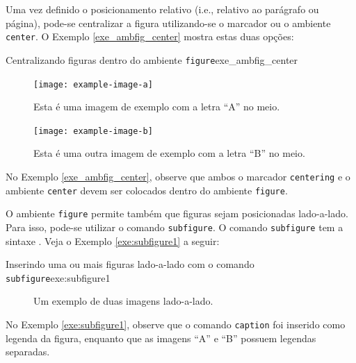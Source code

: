 Uma vez definido o posicionamento relativo (i.e., relativo ao parágrafo ou página), pode-se centralizar a figura utilizando-se o marcador \texttt{\centering} ou o ambiente {\tt center}. O Exemplo \ref{exe_ambfig_center} mostra estas duas opções:

\begin{texexptitled}[breakable,enhanced,middle=2mm]{Centralizando figuras dentro do ambiente {\tt figure}}{exe_ambfig_center}
\lipsum[1]
\begin{figure}[H]
\centering
\texttt{[image: example-image-a]}
\caption{Esta é uma imagem de exemplo com a letra ``A'' no meio.}
\end{figure}
\lipsum[2]
\begin{figure}[H]
    \begin{center}
        \texttt{[image: example-image-b]}
        \caption{Esta é uma outra imagem de exemplo com a letra ``B'' no meio.}
    \end{center}
\end{figure}
\end{texexptitled}

No Exemplo \ref{exe_ambfig_center}, observe que ambos o marcador \texttt{centering} e o ambiente {\tt center} devem ser colocados dentro do ambiente {\tt figure}.

O ambiente {\tt figure} permite também que figuras sejam posicionadas lado-a-lado. Para isso, pode-se utilizar o comando {\tt subfigure}. O comando {\tt subfigure} tem a sintaxe \texttt{\subfigure[]{}}. Veja o Exemplo \ref{exe:subfigure1} a seguir:

\begin{texexptitled}[breakable,enhanced,middle=2mm]{Inserindo uma ou mais figuras lado-a-lado com o comando {\tt subfigure}}{exe:subfigure1}
\begin{figure}[H]
    \begin{center}
        \caption{Um exemplo de duas imagens lado-a-lado.}
    \end{center}
\end{figure}
\end{texexptitled}

No Exemplo \ref{exe:subfigure1}, observe que o comando \texttt{caption} foi inserido como legenda da figura, enquanto que as imagens ``A'' e ``B'' possuem legendas separadas.

